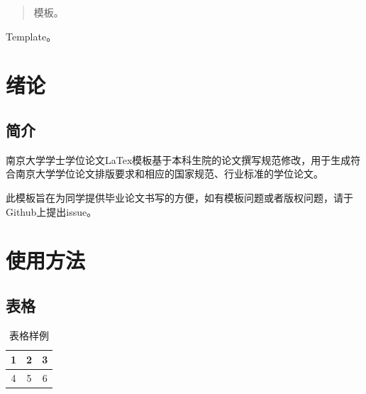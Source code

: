 \documentclass[
    Title = 曲率引擎的研究, %
    Title_EN = Curvature engine research,
    Grade = 17,
    StudentID = 17184xxx,
    StudentName = 张三,
    StudentName_EN = ZhangSan,
    Department = 未来学院,
    Department_EN = School of future,
    Major = 未来学,
    Major_EN = Future,
    Mentor = 李四,
    Mentor_EN = LiSi,
    MentorTitle = 教授,
    MentorTitle_EN = Professor,
    SubmitDate = 2077年12月31日,
    Degree = 本科, %
    Type = thesis %
]{njuthesis}
\begin{document}
\maketitle


\begin{abstract}
    模板。
\end{abstract}

\begin{englishabstract}
    Template。
  \end{englishabstract}

\tableofcontents
\mainmatter

\chapter{绪论}
    \section{简介}
    南京大学学士学位论文LaTex模板\cite{njuthesis}基于本科生院的论文撰写规范修改，用于生成符合南京大学学位论文排版要求和相应的国家规范、行业标准的学位论文。

    此模板旨在为同学提供毕业论文书写的方便，如有模板问题或者版权问题，请于Github上提出issue。
\chapter{使用方法}
    \section{表格}
    \begin{table}[htbp]
        \centering
        \caption{表格样例}
        \begin{tabular}{|c|c|c|}
            \hline
            1 & 2 & 3 \\
            \hline
            4 &  5 & 6 \\
            \hline
        \end{tabular}
    \end{table}
\end{document}
